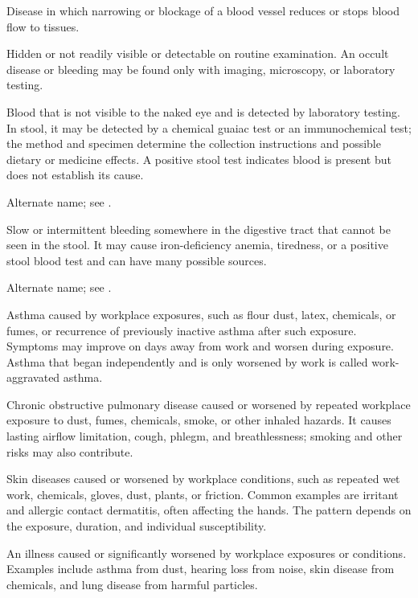  Disease in which narrowing or blockage of a blood vessel reduces or stops blood flow to tissues.

 Hidden or not readily visible or detectable on routine examination. An occult disease or bleeding may be found only with imaging, microscopy, or laboratory testing.

 Blood that is not visible to the naked eye and is detected by laboratory testing. In stool, it may be detected by a chemical guaiac test or an immunochemical test; the method and specimen determine the collection instructions and possible dietary or medicine effects. A positive stool test indicates blood is present but does not establish its cause.

 Alternate name; see .

 Slow or intermittent bleeding somewhere in the digestive tract that cannot be seen in the stool. It may cause iron-deficiency anemia, tiredness, or a positive stool blood test and can have many possible sources.

 Alternate name; see .

 Asthma caused by workplace exposures, such as flour dust, latex, chemicals, or fumes, or recurrence of previously inactive asthma after such exposure. Symptoms may improve on days away from work and worsen during exposure. Asthma that began independently and is only worsened by work is called work-aggravated asthma.

 Chronic obstructive pulmonary disease caused or worsened by repeated workplace exposure to dust, fumes, chemicals, smoke, or other inhaled hazards. It causes lasting airflow limitation, cough, phlegm, and breathlessness; smoking and other risks may also contribute.

 Skin diseases caused or worsened by workplace
conditions, such as repeated wet work, chemicals, gloves, dust, plants, or friction.
Common examples are irritant and allergic contact dermatitis, often affecting the
hands. The pattern depends on the exposure, duration, and individual susceptibility.

 An illness caused or significantly worsened by workplace exposures or conditions. Examples include asthma from dust, hearing loss from noise, skin disease from chemicals, and lung disease from harmful particles.

